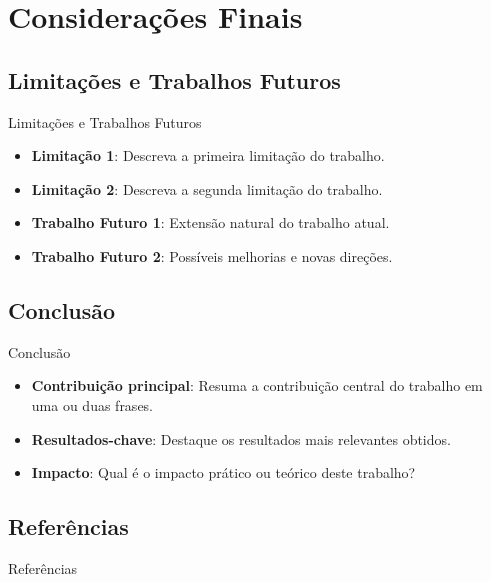 \section{Considerações Finais}

\subsection{Limitações e Trabalhos Futuros}
\begin{frame}{Limitações e Trabalhos Futuros}
  \begin{itemize}
    \setlength{\itemsep}{10pt}
    \item \textbf{Limitação 1}: Descreva a primeira limitação do trabalho.
    \item \textbf{Limitação 2}: Descreva a segunda limitação do trabalho.
    \item \textbf{Trabalho Futuro 1}: Extensão natural do trabalho atual.
    \item \textbf{Trabalho Futuro 2}: Possíveis melhorias e novas direções.
  \end{itemize}
\end{frame}

\subsection{Conclusão}
\begin{frame}{Conclusão}
  \small
  \begin{itemize}
    \setlength{\itemsep}{12pt}
    \item \textbf{Contribuição principal}: Resuma a contribuição central do trabalho em uma ou duas frases.
    \item \textbf{Resultados-chave}: Destaque os resultados mais relevantes obtidos.
    \item \textbf{Impacto}: Qual é o impacto prático ou teórico deste trabalho?
  \end{itemize}
\end{frame}

\subsection{Referências}
\begin{frame}[allowframebreaks]{Referências}
  \nocite{*}
  
  
\end{frame}

